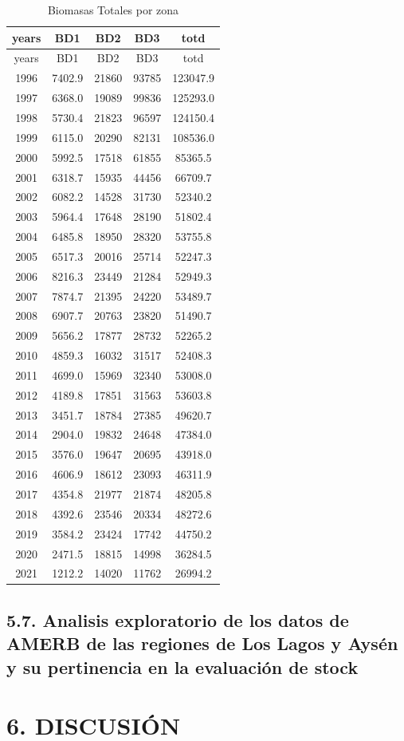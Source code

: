 \documentclass[
]{article}
\begin{document}
\begin{longtable}[]{@{}ccccc@{}}
\caption{Biomasas Totales por zona}\tabularnewline
\toprule
years & BD1 & BD2 & BD3 & totd\tabularnewline
\midrule
\endfirsthead
\toprule
years & BD1 & BD2 & BD3 & totd\tabularnewline
\midrule
\endhead
1996 & 7402.9 & 21860 & 93785 & 123047.9\tabularnewline
1997 & 6368.0 & 19089 & 99836 & 125293.0\tabularnewline
1998 & 5730.4 & 21823 & 96597 & 124150.4\tabularnewline
1999 & 6115.0 & 20290 & 82131 & 108536.0\tabularnewline
2000 & 5992.5 & 17518 & 61855 & 85365.5\tabularnewline
2001 & 6318.7 & 15935 & 44456 & 66709.7\tabularnewline
2002 & 6082.2 & 14528 & 31730 & 52340.2\tabularnewline
2003 & 5964.4 & 17648 & 28190 & 51802.4\tabularnewline
2004 & 6485.8 & 18950 & 28320 & 53755.8\tabularnewline
2005 & 6517.3 & 20016 & 25714 & 52247.3\tabularnewline
2006 & 8216.3 & 23449 & 21284 & 52949.3\tabularnewline
2007 & 7874.7 & 21395 & 24220 & 53489.7\tabularnewline
2008 & 6907.7 & 20763 & 23820 & 51490.7\tabularnewline
2009 & 5656.2 & 17877 & 28732 & 52265.2\tabularnewline
2010 & 4859.3 & 16032 & 31517 & 52408.3\tabularnewline
2011 & 4699.0 & 15969 & 32340 & 53008.0\tabularnewline
2012 & 4189.8 & 17851 & 31563 & 53603.8\tabularnewline
2013 & 3451.7 & 18784 & 27385 & 49620.7\tabularnewline
2014 & 2904.0 & 19832 & 24648 & 47384.0\tabularnewline
2015 & 3576.0 & 19647 & 20695 & 43918.0\tabularnewline
2016 & 4606.9 & 18612 & 23093 & 46311.9\tabularnewline
2017 & 4354.8 & 21977 & 21874 & 48205.8\tabularnewline
2018 & 4392.6 & 23546 & 20334 & 48272.6\tabularnewline
2019 & 3584.2 & 23424 & 17742 & 44750.2\tabularnewline
2020 & 2471.5 & 18815 & 14998 & 36284.5\tabularnewline
2021 & 1212.2 & 14020 & 11762 & 26994.2\tabularnewline
\bottomrule
\end{longtable}

\hypertarget{analisis-exploratorio-de-los-datos-de-amerb-de-las-regiones-de-los-lagos-y-aysuxe9n-y-su-pertinencia-en-la-evaluaciuxf3n-de-stock-1}{%
\subsection{5.7. Analisis exploratorio de los datos de AMERB de las
regiones de Los Lagos y Aysén y su pertinencia en la evaluación de
stock}\label{analisis-exploratorio-de-los-datos-de-amerb-de-las-regiones-de-los-lagos-y-aysuxe9n-y-su-pertinencia-en-la-evaluaciuxf3n-de-stock-1}}

\hypertarget{discusiuxf3n}{%
\section{6. DISCUSIÓN}\label{discusiuxf3n}}
\end{document}

